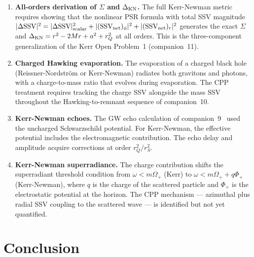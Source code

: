 \documentclass[12pt]{article}
\newcommand{\rQ}{r_Q}
\newcommand{\SSV}{\mathrm{SSV}}
\begin{document}
\begin{enumerate}
  \item \label{op:allorders}
    \textbf{All-orders derivation of $\Sigma$ and $\Delta_{\rm KN}$.}
    The full Kerr-Newman metric requires showing that the nonlinear
    PSR formula with total SSV magnitude $|\Delta\SSV|^2 =
    |\Delta\SSV|_{\rm scalar}^2 + |(\SSV_{\rm net})_\phi|^2 +
    |(\SSV_{\rm net})_r|^2$ generates the exact $\Sigma$ and
    $\Delta_{\rm KN} = r^2 - 2Mr + a^2 + \rQ^2$ at all orders.
    This is the three-component generalization of the Kerr
    Open Problem~1 (companion~11).

  \item \textbf{Charged Hawking evaporation.}
    The evaporation of a charged black hole (Reissner-Nordström or
    Kerr-Newman) radiates both gravitons and photons, with a
    charge-to-mass ratio that evolves during evaporation.  The CPP
    treatment requires tracking the charge SSV alongside the
    mass SSV throughout the Hawking-to-remnant sequence of
    companion~10.

  \item \textbf{Kerr-Newman echoes.}
    The GW echo calculation of companion~9~\cite{c9} used the uncharged
    Schwarzschild potential.  For Kerr-Newman, the effective potential
    includes the electromagnetic contribution.  The echo delay and
    amplitude acquire corrections at order $\rQ^2/r_S^2$.

  \item \textbf{Kerr-Newman superradiance.}
    The charge contribution shifts the superradiant threshold condition
    from $\omega < m\Omega_+$ (Kerr) to $\omega < m\Omega_+ + q\Phi_+$
    (Kerr-Newman), where $q$ is the charge of the scattered particle
    and $\Phi_+$ is the electrostatic potential at the horizon.
    The CPP mechanism — azimuthal plus radial SSV coupling to
    the scattered wave — is identified but not yet quantified.
\end{enumerate}

\section{Conclusion}
\label{sec:conclusion}
\end{document}
